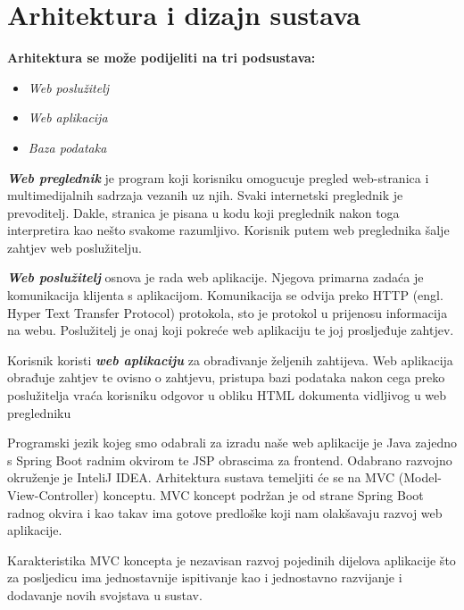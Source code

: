 \chapter{Arhitektura i dizajn sustava}


\textbf{Arhitektura se može podijeliti na tri podsustava:}
\begin{itemize}
	\item \textit{Web poslužitelj}
	\item \textit{Web aplikacija}
	\item \textit{Baza podataka}
\end{itemize}

\emph{\textit{\textbf{Web preglednik}}} je program koji korisniku omogucuje pregled web-stranica i multimedijalnih sadrzaja vezanih uz njih. Svaki internetski preglednik je prevoditelj. Dakle, stranica je pisana u kodu koji preglednik nakon toga interpretira kao
nešto svakome razumljivo. Korisnik putem web preglednika šalje zahtjev web poslužitelju.

\emph{\textit{\textbf{Web poslužitelj}}} osnova je rada web aplikacije. Njegova primarna zadaća je komunikacija klijenta s aplikacijom. Komunikacija se odvija preko HTTP (engl. Hyper
Text Transfer Protocol) protokola, sto je protokol u prijenosu informacija na webu.
Poslužitelj je onaj koji pokreće web aplikaciju te joj prosljeđuje zahtjev.

Korisnik koristi \emph{\textit{\textbf{web aplikaciju}}} za obrađivanje željenih zahtijeva. Web aplikacija
obrađuje zahtjev te ovisno o zahtjevu, pristupa bazi podataka nakon cega preko
poslužitelja vraća korisniku odgovor u obliku HTML dokumenta vidljivog u web
pregledniku

Programski jezik kojeg smo odabrali za izradu naše web aplikacije je Java zajedno s Spring Boot radnim okvirom te JSP obrascima za frontend. Odabrano razvojno okruženje je InteliJ IDEA. Arhitektura sustava temeljiti će se na MVC (Model-View-Controller) konceptu. MVC koncept podržan je od strane Spring Boot radnog okvira i kao takav ima gotove predloške koji nam olakšavaju razvoj web aplikacije.

Karakteristika MVC koncepta je nezavisan razvoj pojedinih dijelova aplikacije
što za posljedicu ima jednostavnije ispitivanje kao i jednostavno razvijanje i dodavanje novih svojstava u sustav.

